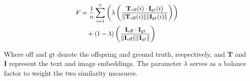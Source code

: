 \[
\small
\begin{aligned}
F &= \frac{1}{n} \sum_{i=1}^{n} \left( \lambda \left( \frac{\mathbf{T}_{\text{off}}(i) \cdot \mathbf{I}_{\text{gt}}(i)}{\|\mathbf{T}_{\text{off}}(i)\| \|\mathbf{I}_{\text{gt}}(i)\|} \right) \right) \\
  &\quad + (1 - \lambda)  \left( \frac{\mathbf{I}_{\text{off}} \cdot \mathbf{I}_{\text{gt}}}{\|\mathbf{I}_{\text{off}}\| \|\mathbf{I}_{\text{gt}}\|} \right)
\end{aligned}
\]

Where \( \text{off} \) and \( \text{gt} \) denote the offspring and ground truth, respectively, and \( \mathbf{T} \) and \( \mathbf{I} \) represent the text and image embeddings. The parameter \(\lambda\) serves as a balance factor to weight the two similarity measures.



